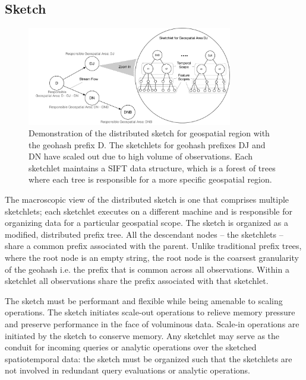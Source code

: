 \subsection{Sketch}
\begin{figure}
    \centerline{\includegraphics[width=0.8\textwidth]{figures/dist-sketch.pdf}}
    \caption{Demonstration of the distributed sketch for geospatial region with the geohash prefix D. The sketchlets for geohash prefixes DJ and DN have scaled out due to high volume of observations. Each sketchlet maintains a SIFT data structure, which is a forest of trees where each tree is responsible for a more specific geospatial region.}
    \label{fig:dist-sketch}
\end{figure}

The macroscopic view of the distributed sketch is one that comprises multiple sketchlets; each sketchlet executes on a different machine and is responsible for organizing data for a particular geospatial scope. The sketch is organized as a modified, distributed prefix tree. All the descendant nodes -- the sketchlets -- share a common prefix associated with the parent. Unlike traditional prefix trees, where the root node is an empty string, the root node is the coarsest granularity of the geohash i.e. the prefix that is common across all observations. Within a sketchlet all observations share the prefix associated with that sketchlet.

The sketch must be performant and flexible while being amenable to scaling operations. The sketch initiates scale-out operations to relieve memory pressure and preserve performance in the face of voluminous data. Scale-in operations are initiated by the sketch to conserve memory. Any sketchlet may serve as the conduit for incoming queries or analytic operations over the sketched spatiotemporal data: the sketch must be organized such that the sketchlets are not involved in redundant query evaluations or analytic operations. 

